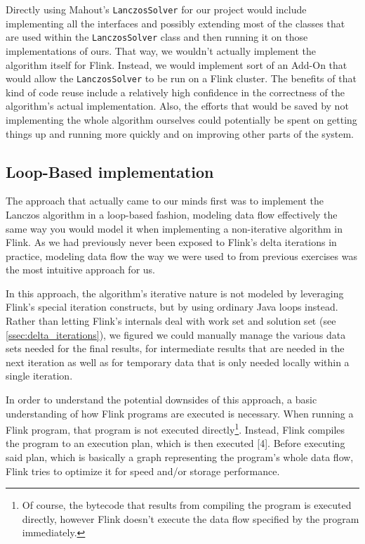 
Directly using Mahout's \texttt{LanczosSolver} for our project would include implementing all
the interfaces and possibly extending most of the classes that are used within the
\texttt{LanczosSolver} class and then running it on those implementations of ours. That way, we
wouldn't actually implement the algorithm itself for Flink. Instead, we would implement sort of
an Add-On that would allow the \texttt{LanczosSolver} to be run on a Flink cluster. The benefits
of that kind of code reuse include a relatively high confidence in the correctness of the
algorithm's actual implementation. Also, the efforts that would be saved by not implementing the
whole algorithm ourselves could potentially be spent on getting things up and running more
quickly and on improving other parts of the system.



\subsection{Loop-Based implementation}

The approach that actually came to our minds first was to implement the Lanczos algorithm in a
loop-based fashion, modeling data flow effectively the same way you would model it when
implementing a non-iterative algorithm in Flink. As we had previously never been exposed to
Flink's delta iterations in practice, modeling data flow the way we were used to from previous
exercises was the most intuitive approach for us.

In this approach, the algorithm's iterative nature is not modeled by leveraging Flink's special
iteration constructs, but by using ordinary Java loops instead. Rather than letting Flink's
internals deal with work set and solution set (see \ref{ssec:delta_iterations}), we figured we
could manually manage the various data sets needed for the final results, for intermediate
results that are needed in the next iteration as well as for temporary data that is only needed
locally within a single iteration.


In order to understand the potential downsides of this approach, a basic understanding of how
Flink programs are executed is necessary. When running a Flink program, that program is not
executed directly\footnote{Of course, the bytecode that results from compiling the program is
executed directly, however Flink doesn't execute the data flow specified by the program
immediately.}. Instead, Flink compiles the program to an execution plan, which is then executed
[4]. Before executing said plan, which is basically a graph representing the program's whole
data flow, Flink tries to optimize it for speed and/or storage performance.

